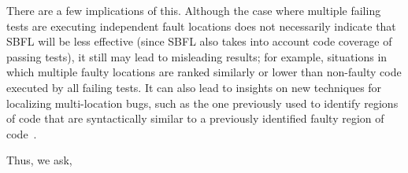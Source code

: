 \documentclass[10pt,journal,compsoc]{IEEEtran}
\begin{document}
There are a few implications of this. Although the case where multiple failing tests are executing
independent fault locations does not necessarily indicate that SBFL will be less effective
(since SBFL also takes into account code coverage of passing tests), it still may lead to misleading results;
for example, situations in which multiple faulty locations are ranked similarly or lower than non-faulty code
executed by all failing tests. It can also lead to insights on new techniques for localizing multi-location 
bugs, such as the one previously used to identify regions of code that are syntactically similar to a 
previously identified faulty region of code~\cite{saha2019harnessing}.

Thus, we ask, 





\end{document}
